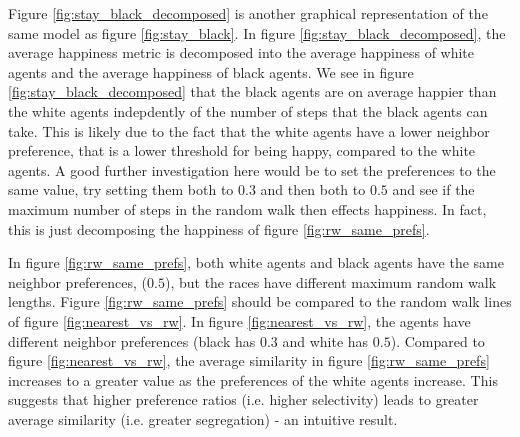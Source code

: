 \documentclass[11pt,twoside]{amsart}
\theoremstyle{theorem}
\theoremstyle{definition}
\theoremstyle{remark}
\begin{document}
Figure \ref{fig:stay_black_decomposed} is another graphical representation of the same model as figure \ref{fig:stay_black}. 
In figure \ref{fig:stay_black_decomposed}, the average happiness metric is decomposed into the average happiness of white agents and the average happiness of black agents.
We see in figure \ref{fig:stay_black_decomposed} that the black agents are on average happier than the white agents indepdently of the number of steps that the black agents can take. 
This is likely due to the fact that the white agents have a lower neighbor preference, that is a lower threshold for being happy, compared to the white agents. 
A good further investigation here would be to set the preferences to the same value, try setting them both to $0.3$ and then both to $0.5$ and see if the maximum number of steps in the random walk then effects happiness. 
In fact, this is just decomposing the happiness of figure \ref{fig:rw_same_prefs}.

In figure \ref{fig:rw_same_prefs}, both white agents and black agents have the same neighbor preferences, ($0.5$), but the races have different maximum random walk lengths. 
Figure \ref{fig:rw_same_prefs} should be compared to the random walk lines of figure \ref{fig:nearest_vs_rw}. 
In figure \ref{fig:nearest_vs_rw}, the agents have different neighbor preferences (black has $0.3$ and white has $0.5$). 
Compared to figure \ref{fig:nearest_vs_rw}, the average similarity in figure \ref{fig:rw_same_prefs} increases to a greater value as the preferences of the white agents increase. 
This suggests that higher preference ratios (i.e. higher selectivity) leads to greater average similarity (i.e. greater segregation) - an intuitive result.
\end{document}
